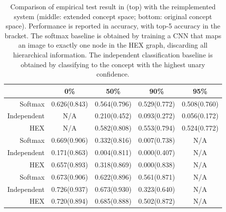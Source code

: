 \documentclass[11pt,a4paper]{article}
\begin{document}
\begin{table}[htbp]
\centering
\begin{tabular}{r|c|c|c|c}
 & 0\% & 50\% & 90\% & 95\%\\
\hline
Softmax     & 0.626(0.843) & 0.564(0.796) & 0.529(0.772) & 0.508(0.760)\\
Independent & N/A          & 0.210(0.452) & 0.093(0.272) & 0.056(0.172)\\
HEX         & N/A          & 0.582(0.808) & 0.553(0.794) & 0.524(0.772)\\
\hline
Softmax     & 0.669(0.906) & 0.332(0.816) & 0.007(0.738) & N/A\\
Independent & 0.171(0.863) & 0.004(0.811) & 0.000(0.407) & N/A\\
HEX         & 0.657(0.893) & 0.318(0.869) & 0.000(0.838) & N/A\\
\hline
Softmax     & 0.673(0.906) & 0.622(0.896) & 0.561(0.871) & N/A\\
Independent & 0.726(0.937) & 0.673(0.930) & 0.323(0.640) & N/A\\
HEX         & 0.720(0.894) & 0.685(0.888) & 0.502(0.872) & N/A
\end{tabular}
\caption{Comparison of empirical test result in \cite{deng2014large} (top) with the reimplemented system (middle: extended concept space; bottom: original concept space). Performance is reported in accuracy, with top-5 accuracy in the bracket. The softmax baseline is obtained by training a CNN that maps an image to exactly one node in the HEX graph, discarding all hierarchical information. The independent classification baseline is obtained by classifying to the concept with the highest unary confidence.}
\label{tab:original}
\end{table}
\end{document}
